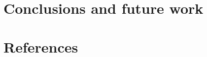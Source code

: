 \documentclass[12pt]{iopart}
\begin{document}

\section{Conclusions and future work}

\section{References}
\end{document}
